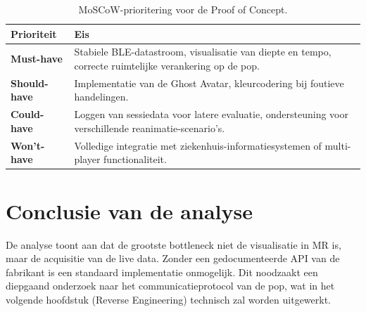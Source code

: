 \begin{table}[ht]
    \centering
    \begin{tabular}{|l|p{10cm}|}
        \hline
        \textbf{Prioriteit} & \textbf{Eis} \\ \hline
        \textbf{Must-have} & Stabiele BLE-datastroom, visualisatie van diepte en tempo, correcte ruimtelijke verankering op de pop. \\ \hline
        \textbf{Should-have} & Implementatie van de Ghost Avatar, kleurcodering bij foutieve handelingen. \\ \hline
        \textbf{Could-have} & Loggen van sessiedata voor latere evaluatie, ondersteuning voor verschillende reanimatie-scenario's. \\ \hline
        \textbf{Won't-have} & Volledige integratie met ziekenhuis-informatiesystemen of multi-player functionaliteit. \\ \hline
    \end{tabular}
    \caption{MoSCoW-prioritering voor de Proof of Concept.}
    \label{tab:moscow_analyse}
\end{table}

\section{Conclusie van de analyse}
De analyse toont aan dat de grootste bottleneck niet de visualisatie in MR is, maar de acquisitie van de live data. Zonder een gedocumenteerde API van de fabrikant is 
een standaard implementatie onmogelijk. Dit noodzaakt een diepgaand onderzoek naar het communicatieprotocol van de pop, wat in het volgende hoofdstuk (Reverse Engineering) 
technisch zal worden uitgewerkt.